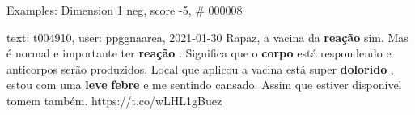 \begin{frame}{Examples: Dimension 1 neg, score -5, \# 000008}
\footnotesize
\begin{alertblock}{text: t004910, user: ppggnaarea, 2021-01-30}
Rapaz, a vacina da \textbf{reação} sim. Mas é normal e importante ter 
\textbf{reação} . Significa que o \textbf{corpo} está respondendo e anticorpos 
serão produzidos. Local que aplicou a vacina está super \textbf{dolorido} , 
estou com uma \textbf{leve} \textbf{febre} e me sentindo cansado. Assim que 
estiver disponível tomem também. https://t.co/wLHL1gBuez 
\end{alertblock}
\end{frame}
